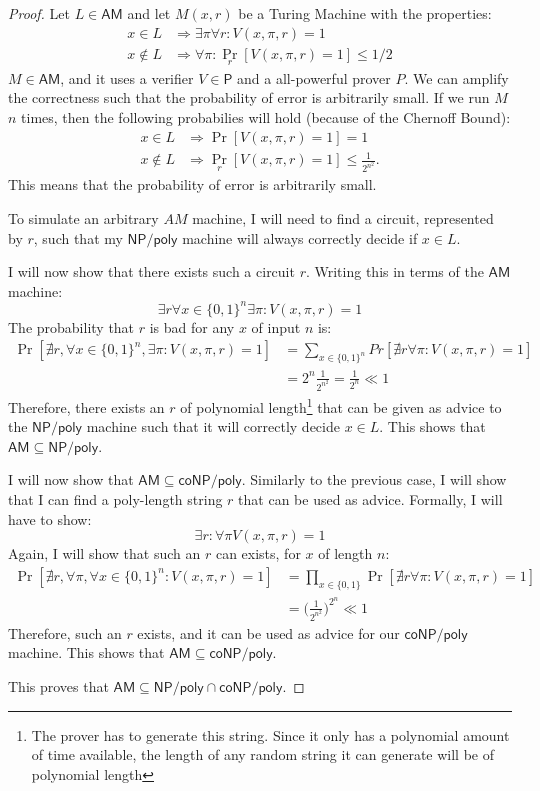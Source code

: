 \documentclass[letterpaper,11pt]{article}
\newcommand{\cc}[1]{\ensuremath{\textsf{#1}}\xspace}
\renewcommand{\P}{\cc{P}}
\newcommand{\NP}{\cc{NP}}
\newcommand{\coNP}{\cc{coNP}}
\newcommand{\AM}{\cc{AM}}
\newcommand{\tm}{Turing Machine}
\newcommand{\NPpoly}{\NP/\textsf{poly}}
\newcommand{\coNPpoly}{\coNP/\textsf{poly}}
\begin{document}
\begin{proof}
Let $L \in \AM$ and let $M(x,r)$ be a \tm{} with the properties:
\begin{align*}
	x \in L &\Rightarrow \exists \pi \forall r : V(x,\pi,r) = 1 \\
	x \not \in L &\Rightarrow \forall \pi  : \underset{r}{\Pr}[V(x,\pi,r) =1] \leq 1/2
\end{align*}
$M \in \AM$, and it uses a verifier $V \in \P$ and a all-powerful prover $P$.
We can amplify the correctness such that the probability of error is arbitrarily small.
If we run $M$ $n$ times, then the following probabilies will hold (because of the Chernoff Bound):
\begin{align*}
	x \in L &\Rightarrow \Pr[V(x,\pi,r) =1] = 1 \\
	x \not \in L &\Rightarrow \underset{r}{\Pr}[V(x,\pi,r) = 1] \leq \frac{1}{2^{n^2}}.
\end{align*}
This means that the probability of error is arbitrarily small.

To simulate an arbitrary $AM$ machine, I will need to find a circuit, represented by $r$, such that my $\NPpoly$ machine will always correctly decide if $x \in L$.

I will now show that there exists such a circuit $r$.
Writing this in terms of the $\AM$ machine:
\[
	\exists r \forall x \in \{0,1\}^n \exists{\pi}: V(x,\pi,r) = 1
\]
The probability that $r$ is bad for any $x$ of input $n$ is:
\begin{align*}
	\Pr[\nexists r, \forall x \in \{0,1\}^n, \exists \pi: V(x,\pi,r) = 1] &= \sum_{x \in \{0,1\}^n} Pr[\nexists r \forall \pi: V(x,\pi,r) = 1] \\
	&= 2^n \frac{1}{2^{n^2}} = \frac{1}{2^n} \ll 1
\end{align*}
Therefore, there exists an $r$ of polynomial length\footnote{The prover has to generate this string. Since it only has a polynomial amount of time available, the length of any random string it can generate will be of polynomial length} that can be given as advice to the $\NPpoly$ machine such that it will correctly decide $x \in L$.
This shows that $\AM \subseteq \NPpoly$.

I will now show that $\AM \subseteq \coNPpoly$.
Similarly to the previous case, I will show that I can find a poly-length string $r$ that can be used as advice.
Formally, I will have to show:
\[
	\exists r : \forall \pi V(x,\pi,r) = 1
\]
Again, I will show that such an $r$ can exists, for $x$ of length $n$:
\begin{align*}
	\Pr[\nexists r, \forall \pi, \forall x \in \{0,1\}^n : V(x,\pi,r) = 1] &= \prod_{x \in \{0,1\}} \Pr[\nexists r \forall \pi : V(x,\pi,r) = 1] \\
	&= \Big(\frac{1}{2^{n^2}}\Big)^{2^n} \ll 1
\end{align*}
Therefore, such an $r$ exists, and it can be used as advice for our $\coNPpoly$ machine.
This shows that $\AM \subseteq \coNPpoly$.

This proves that $\AM \subseteq \NPpoly \cap \coNPpoly$.
\end{proof}
\end{document}
